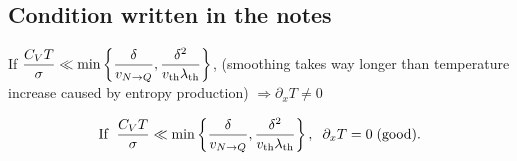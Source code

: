 \documentclass[11pt]{article}
\begin{document}
\subsection{Condition written in the notes}

If $\displaystyle \frac{C_V T}{\sigma}
\ll
\min\left\{
\frac{\delta}{v_{N\to Q}},
\frac{\delta^2}{v_{\rm th}\lambda_{\rm th}}
\right\}$, (smoothing takes way longer than temperature increase caused by entropy production) $\Rightarrow \partial_x T \neq 0$

\begin{equation}
\text{If }\;
\frac{C_V T}{\sigma}
\ll
\min\left\{
\frac{\delta}{v_{N\to Q}},
\frac{\delta^2}{v_{\rm th}\lambda_{\rm th}}
\right\},
\;\;\partial_x T = 0 \;\text{(good).}
\end{equation}
\end{document}
